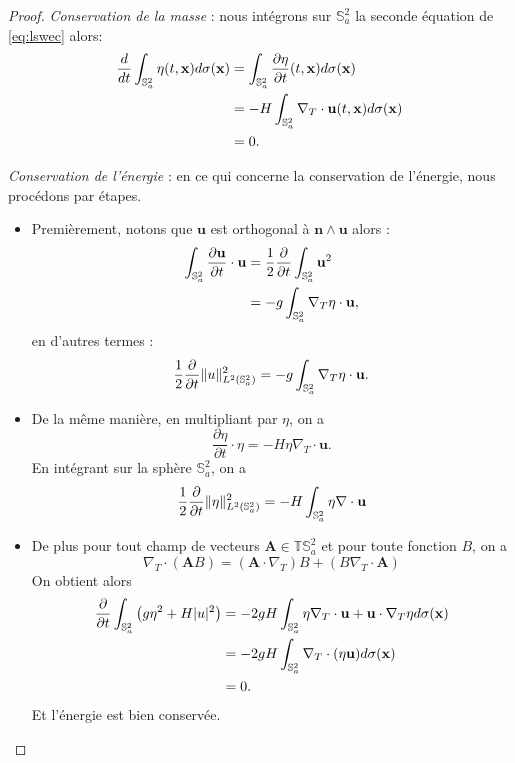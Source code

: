 \begin{proof}
\textit{Conservation de la masse} :
nous intégrons sur $\mathbb{S}_a^2$ la seconde équation de \eqref{eq:lswec} alors:
\begin{align*}
\dfrac{d}{dt} \displaystyle\int_{\mathbb{S}_a^2} \eta(t,\mathbf{x})d\sigma(\mathbf{x}) & = \displaystyle\int_{\mathbb{S}_a^2} \dfrac{\partial \eta}{\partial t}(t,\mathbf{x})d\sigma(\mathbf{x})\\
	& = - H \displaystyle\int_{\mathbb{S}_a^2} \nabla_T \cdot \mathbf{u}(t,\mathbf{x}) d \sigma(\mathbf{x}) \\
	& = 0.
\end{align*}

\textit{Conservation de l'énergie}  :
en ce qui concerne la conservation de l'énergie, nous procédons par étapes.
\begin{itemize}
\item Premièrement, notons que $\mathbf{u}$ est orthogonal à $\mathbf{n} \wedge \mathbf{u}$ alors :
\begin{align*}
\displaystyle\int_{\mathbb{S}_a^2} \dfrac{\partial \mathbf{u}}{\partial t} \cdot \mathbf{u} & = \dfrac{1}{2} \dfrac{\partial}{\partial t} \displaystyle\int_{\mathbb{S}_a^2} \mathbf{u}^2 \\
	& = -g \displaystyle\int_{\mathbb{S}_a^2} \nabla_T \eta \cdot \mathbf{u},
\end{align*}
en d'autres termes :
\begin{equation}
\dfrac{1}{2} \dfrac{\partial}{\partial t} \| u \|_{L^2(\mathbb{S}_a^2)}^2 = -g \displaystyle\int_{\mathbb{S}_a^2} \nabla_T \eta \cdot \mathbf{u}.
\label{energy_eq1}
\end{equation}
\item De la même manière, en multipliant par $\eta$, on a
\begin{equation}
\dfrac{\partial \eta}{\partial t} \cdot \eta = -H \eta \nabla_T \cdot \mathbf{u}.
\end{equation}
En intégrant sur la sphère $\mathbb{S}_a^2$, on a
\begin{equation}
\dfrac{1}{2} \dfrac{\partial}{\partial t} \| \eta \|^2_{L^2(\mathbb{S}_a^2)} = -H \displaystyle\int_{\mathbb{S}_a^2} \eta \nabla \cdot \mathbf{u}
\label{energy_eq2}
\end{equation}
\item De plus pour tout champ de vecteurs $\mathbf{A} \in \mathbb{T}\mathbb{S}_a^2$ et pour toute fonction $B$, on a
\begin{equation}
\nabla_T \cdot \left( \mathbf{A} B \right) = \left( \mathbf{A} \cdot \nabla_T \right) B + \left( B \nabla_T \cdot \mathbf{A} \right)
\label{energy_eq3}
\end{equation}
On obtient alors
\begin{align*}
\dfrac{\partial}{\partial t} \displaystyle\int_{\mathbb{S}^2_a} \left( g  \eta^2 + H | u |^2 \right) & = -2 gH \displaystyle\int_{\mathbb{S}_a^2} \eta \nabla_T \cdot \mathbf{u} + \mathbf{u} \cdot \nabla_T \eta d \sigma(\mathbf{x}) \\
	& = -2 g H\displaystyle\int_{\mathbb{S}_a^2} \nabla_T \cdot (\eta \mathbf{u}) d \sigma(\mathbf{x}) \\
	& = 0.
\end{align*}
Et l'énergie est bien conservée.
\end{itemize}
\end{proof}
